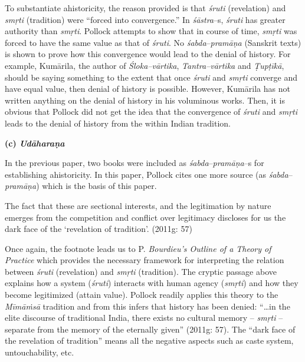 To substantiate ahistoricity, the reason provided is that \textit{śruti }(revelation) and \textit{smṛti} (tradition) were “forced into convergence.” In \textit{śāstra}–s, \textit{śruti} has greater authority than \textit{smṛti}. Pollock attempts to show that in course of time, \textit{smṛti }was forced to have the same value as that of\textit{ śruti}. No \textit{śabda}–\textit{pramāṇa} (Sanskrit texts) is shown to prove how this convergence would lead to the denial of history. For example, Kumārila, the author of \textit{Śloka–vārtika}, \textit{Tantra–vārtika} and \textit{Ṭupṭīkā}, should be saying something to the extent that once \textit{śruti} and \textit{smṛti }converge and have equal value, then denial of history is possible. However, Kumārila has not written anything on the denial of history in his voluminous works. Then, it is obvious that Pollock did not get the idea that the convergence of \textit{śruti} and \textit{smṛti} leads to the denial of history from the within Indian tradition.

\vspace{.15cm}

\textbf{(c) \textit{Udāharaṇa}}

In the previous paper, two books were included as\textit{ śabda}–\textit{pramāṇa}–s for establishing ahistoricity. In this paper, Pollock cites one more source (as \textit{śabda}–\textit{pramāṇa}) which is the basis of this paper.

\begin{myquote}
The fact that these are sectional interests, and the legitimation by nature emerges from the competition and conflict over legitimacy discloses for us the dark face of the ‘revelation of tradition’. (2011g: 57)
\end{myquote}

Once again, the footnote leads us to P. \textit{Bourdieu’s Outline of a Theory of Practice} which provides the necessary framework for interpreting the relation between \textit{śruti }(revelation) and \textit{smṛti} (tradition). The cryptic passage above explains how a system (\textit{śruti}) interacts with human agency (\textit{smṛti}) and how they become legitimized (attain value). Pollock readily applies this theory to the \textit{Mīmāṁsā} tradition and from this infers that history has been denied: “…in the elite discourse of traditional India, there exists no cultural memory –\textit{ smṛti }– separate from the memory of the eternally given” (2011g: 57). The “dark face of the revelation of tradition” means all the negative aspects such as caste system, untouchability, etc.

